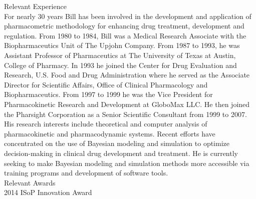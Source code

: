 \noindent
{\sc Relevant Experience}
\\[2pt]
For nearly 30 years Bill has been involved in the development and
application of pharmacometric methodology for enhancing drug
treatment, development and regulation. From 1980 to 1984, Bill was a
Medical Research Associate with the Biopharmaceutics Unit of The
Upjohn Company. From 1987 to 1993, he was Assistant Professor of
Pharmaceutics at The University of Texas at Austin, College of
Pharmacy. In 1993 he joined the Center for Drug Evaluation and
Research, U.S. Food and Drug Administration where he served as the
Associate Director for Scientific Affairs, Office of Clinical
Pharmacology and Biopharmaceutics. From 1997 to 1999 he was the Vice
President for Pharmacokinetic Research and Development at GloboMax
LLC. He then joined the Pharsight Corporation as a Senior Scientific
Consultant from 1999 to 2007. His research interests include
theoretical and computer analysis of pharmacokinetic and
pharmacodynamic systems. Recent efforts have concentrated on the use
of Bayesian modeling and simulation to optimize decision-making in
clinical drug development and treatment. He is currently seeking to
make Bayesian modeling and simulation methods more accessible via
training programs and development of software tools.
\\

\noindent
{\sc Relevant Awards}
\\[2pt]
2014 ISoP Innovation Award
\\

